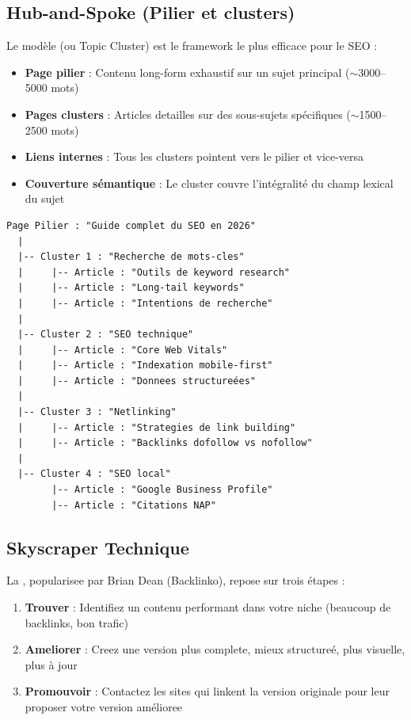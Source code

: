 \subsection{Hub-and-Spoke (Pilier et clusters)}

Le modèle  (ou Topic Cluster) est le framework le plus efficace pour le SEO :

\begin{itemize}
    \item \textbf{Page pilier} : Contenu long-form exhaustif sur un sujet principal ($\sim$3000--5000 mots)
    \item \textbf{Pages clusters} : Articles detailles sur des sous-sujets spécifiques ($\sim$1500--2500 mots)
    \item \textbf{Liens internes} : Tous les clusters pointent vers le pilier et vice-versa
    \item \textbf{Couverture sémantique} : Le cluster couvre l'intégralité du champ lexical du sujet
\end{itemize}

\begin{lstlisting}[style=htmlcode,caption={Structure Hub-and-Spoke pour le SEO}]
Page Pilier : "Guide complet du SEO en 2026"
  |
  |-- Cluster 1 : "Recherche de mots-cles"
  |     |-- Article : "Outils de keyword research"
  |     |-- Article : "Long-tail keywords"
  |     |-- Article : "Intentions de recherche"
  |
  |-- Cluster 2 : "SEO technique"
  |     |-- Article : "Core Web Vitals"
  |     |-- Article : "Indexation mobile-first"
  |     |-- Article : "Donnees structureées"
  |
  |-- Cluster 3 : "Netlinking"
  |     |-- Article : "Strategies de link building"
  |     |-- Article : "Backlinks dofollow vs nofollow"
  |
  |-- Cluster 4 : "SEO local"
        |-- Article : "Google Business Profile"
        |-- Article : "Citations NAP"
\end{lstlisting}

\subsection{Skyscraper Technique}

La , popularisee par Brian Dean (Backlinko), repose sur trois étapes :

\begin{enumerate}
    \item \textbf{Trouver} : Identifiez un contenu performant dans votre niche (beaucoup de backlinks, bon trafic)
    \item \textbf{Ameliorer} : Creez une version plus complete, mieux structureé, plus visuelle, plus à jour
    \item \textbf{Promouvoir} : Contactez les sites qui linkent la version originale pour leur proposer votre version amélioree
\end{enumerate}

